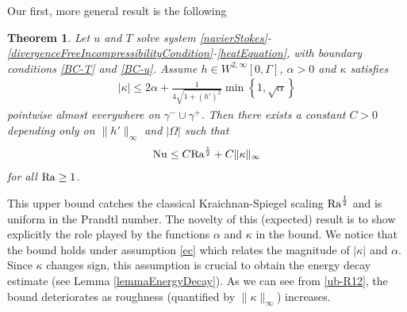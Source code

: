 \documentclass{article}
\newtheorem{theorem}{Theorem}[section]
\theoremstyle{definition}
\theoremstyle{definition}
\newcommand{\Ra}{{\rm{Ra}}}
\newcommand{\Nu}{{\rm{Nu}}}
\begin{document}
Our first, more general result is the following
\begin{theorem}
\label{Lemma-Ra-One-Half-Bound}
Let $u$ and $T$ solve system \eqref{navierStokes}-\eqref{divergenceFreeIncompressibilityCondition}-\eqref{heatEquation}, with boundary conditions \eqref{BC-T} and \eqref{BC-u}. Assume $h \in W^{2,\infty}[0,\Gamma]$, $\alpha>0$
and $\kappa$ satisfies
\begin{align}
    \label{ec}
    |\kappa| \leq 2\alpha + \frac{1}{4\sqrt{1+(h')^2}} \min\left\lbrace 1, \sqrt{\alpha} \right\rbrace
\end{align}
pointwise almost everywhere on $\gamma^-\cup\gamma^+$. 
Then there exists a constant $C>0$ depending only on $\|h'\|_{\infty}$ and $|\Omega|$ such that
\begin{align}\label{ub-R12}
    \Nu \leq C \Ra^\frac{1}{2}+C\|\kappa\|_\infty
\end{align}
for all $\Ra\geq 1$.
\end{theorem}
This upper bound catches the classical Kraichnan-Spiegel %
scaling $\Ra^{\frac 12}$ and is uniform in the Prandtl number. The novelty of this (expected) result is to show explicitly the role played by the functions $\alpha$ and $\kappa$ in the bound. We notice that the bound holds under assumption \eqref{ec} which relates the magnitude of $|\kappa|$ and $\alpha$. Since $\kappa$ changes sign, this assumption is crucial to obtain the energy decay estimate (see Lemma \ref{lemmaEnergyDecay}). As we can see from \eqref{ub-R12}, the bound deteriorates as roughness (quantified by $\|\kappa\|_\infty$) increases.
\end{document}
